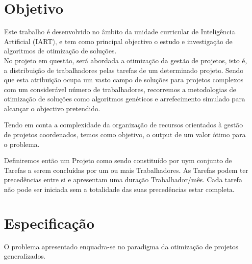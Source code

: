 \documentclass[a4paper]{article}
\begin{document}

\newpage

\section*{Objetivo}

Este trabalho é desenvolvido no âmbito da unidade curricular de Inteligência Artificial (IART), e tem como principal objectivo o estudo e investigação de algoritmos de otimização de soluções. \\ No projeto em questão, será abordada a otimização da gestão de projetos, isto é, a distribuição de trabalhadores pelas tarefas de um determinado projeto. Sendo que esta atribuição ocupa um vasto campo de soluções para projetos complexos com um considerável número de trabalhadores, recorremos a metodologias de otimização de soluções como algoritmos genéticos e arrefecimento simulado para alcançar o objectivo pretendido.

 \par Tendo em conta a complexidade da organização de recursos orientados à gestão de projetos coordenados, temos como objetivo, o output de um valor ótimo para o problema.  
 
 \par Definiremos então um Projeto como sendo constituído por uym conjunto de Tarefas a serem concluídas por um ou mais Trabalhadores. As Tarefas podem ter precedências entre si e apresentam uma duração Trabalhador/mês. Cada tarefa não pode ser iniciada sem a totalidade das suas precedências estar completa.
 


\newpage

\tableofcontents



\newpage

\section{Especificação}
O problema apresentado enquadra-se no paradigma da otimização de projetos generalizados. 
\end{document}

